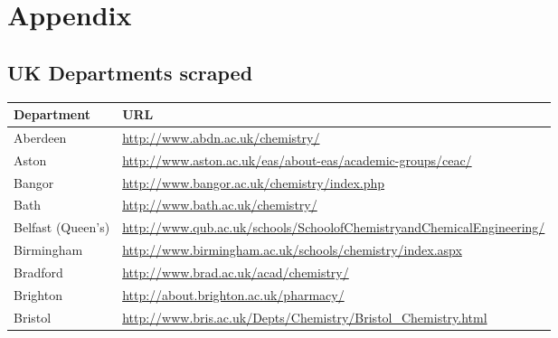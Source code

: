 \chapter{Appendix}
\section{UK Departments scraped}
\begin{table}[H]
\begin{tabular}{||p{2.5cm}|Y||}
\hline
 Department                         & URL \\
\hline
 \footnotesize{Aberdeen                       }    & \footnotesize{\url{http://www.abdn.ac.uk/chemistry/}}                                                                                                     \\
 \footnotesize{Aston                         }     & \footnotesize{\url{http://www.aston.ac.uk/eas/about-eas/academic-groups/ceac/}}                                                                           \\
 \footnotesize{Bangor                       }      & \footnotesize{\url{http://www.bangor.ac.uk/chemistry/index.php}}                                                                                          \\
 \footnotesize{Bath                        }       & \footnotesize{\url{http://www.bath.ac.uk/chemistry/}}                                                                                                     \\
 \footnotesize{Belfast (Queen's)          }        & \footnotesize{\url{http://www.qub.ac.uk/schools/SchoolofChemistryandChemicalEngineering/}}                                                                \\
\footnotesize{Birmingham                }         & \footnotesize{\url{http://www.birmingham.ac.uk/schools/chemistry/index.aspx}}                                                                             \\
\footnotesize{Bradford                 }          & \footnotesize{\url{http://www.brad.ac.uk/acad/chemistry/}                                                                                               } \\
 \footnotesize{Brighton                }           & \footnotesize{\url{http://about.brighton.ac.uk/pharmacy/}}                                                                                                \\
 \footnotesize{Bristol                }            & \footnotesize{\url{http://www.bris.ac.uk/Depts/Chemistry/Bristol\_Chemistry.html}}                                                                         \\

\end{tabular}
\end{table}

